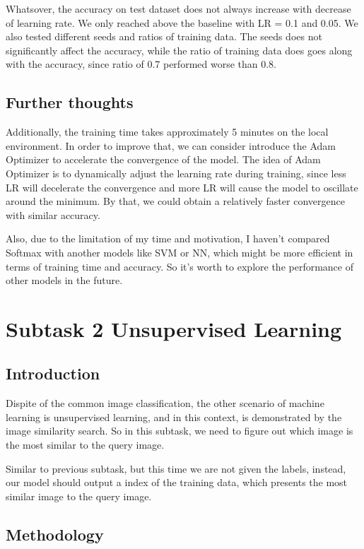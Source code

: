 \documentclass{article}
\begin{document}
Whatsover, the accuracy on test dataset does not always increase with decrease of learning rate. We only reached above the baseline with LR = 0.1 and 0.05. We also tested different seeds and ratios of training data. The seeds does not significantly affect the accuracy, while the ratio of training data does goes along with the accuracy, since ratio of 0.7 performed worse than 0.8.

\subsection{Further thoughts}

Additionally, the training time takes approximately 5 minutes on the local environment. In order to improve that, we can consider introduce the Adam Optimizer to accelerate the convergence of the model. The idea of Adam Optimizer is to dynamically adjust the learning rate during training, since less LR will decelerate the convergence and more LR will cause the model to oscillate around the minimum. By that, we could obtain a relatively faster convergence with similar accuracy.

Also, due to the limitation of my time and motivation, I haven't compared Softmax with another models like SVM or NN, which might be more efficient in terms of training time and accuracy. So it's worth to explore the performance of other models in the future.

\section{Subtask 2 Unsupervised Learning}

\subsection{Introduction}

Dispite of the common image classification, the other scenario of machine learning is unsupervised learning, and in this context, is demonstrated by the image similarity search. So in this subtask, we need to figure out which image is the most similar to the query image.

Similar to previous subtask, but this time we are not given the labels, instead, our model should output a index of the training data, which presents the most similar image to the query image. 

\subsection{Methodology}
\end{document}
